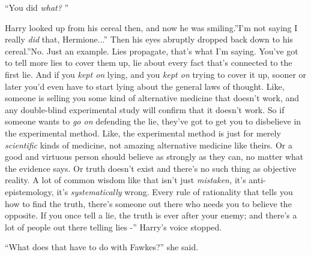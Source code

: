 ``You did \emph{what?} ''

Harry looked up from his cereal then, and now he was smiling.''I'm not
saying I really \emph{did} that, Hermione...'' Then his eyes
abruptly dropped back down to his cereal.''No. Just an example. Lies
propagate, that's what I'm saying. You've got to tell more lies to cover
them up, lie about every fact that's connected to the first lie. And if
you \emph{kept on} lying, and you \emph{kept on} trying to cover it up,
sooner or later you'd even have to start lying about the general laws of
thought. Like, someone is selling you some kind of alternative medicine
that doesn't work, and any double-blind experimental study will confirm
that it doesn't work. So if someone wants to \emph{go on} defending the
lie, they've got to get you to disbelieve in the experimental method.
Like, the experimental method is just for merely \emph{scientific} kinds
of medicine, not amazing alternative medicine like theirs. Or a good and
virtuous person should believe as strongly as they can, no matter what
the evidence says. Or truth doesn't exist and there's no such thing as
objective reality. A lot of common wisdom like that isn't just
\emph{mistaken,} it's anti-epistemology, it's \emph{systematically}
wrong. Every rule of rationality that tells you how to find the truth,
there's someone out there who needs you to believe the opposite. If you
once tell a lie, the truth is ever after your enemy; and there's a lot
of people out there telling lies -'' Harry's voice stopped.

``What does that have to do with Fawkes?'' she said.

